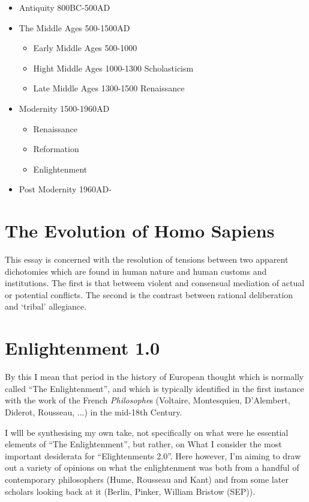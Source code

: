 \documentclass[10pt,titlepage]{article}
\begin{document}
\begin{itemize}
\item Antiquity 800BC-500AD
\item The Middle Ages 500-1500AD
    \begin{itemize}
  \item Early Middle Ages 500-1000
  \item Hight Middle Ages 1000-1300 Scholasticism
  \item Late Middle Ages 1300-1500 Renaissance    
    \end{itemize}
\item Modernity 1500-1960AD
  \begin{itemize}
  \item Renaissance
  \item Reformation
  \item Enlightenment    
    \end{itemize}
\item Post Modernity 1960AD- 
\end{itemize}

\section{The Evolution of Homo Sapiens}

This essay is concerned with the resolution of tensions between two apparent dichotomies which are found in human nature and human customs and institutions.
The first is that betweem violent and consensual mediation of actual or potential conflicts.
The second is the contrast between rational deliberation and `tribal' allegiance.

\section{Enlightenment 1.0}

By this I mean that period in the history of European thought which is normally called ``The Enlightenment'', and which is typically identified in the first instance with the work of the French \emph{Philosophe}s (Voltaire, Montesquieu, D'Alembert, Diderot, Rousseau, ...) in the mid-18th Century.

I wlll be synthesising my own take, not specifically on what were he essential elements of ``The Enlightenment'', but rather, on What I consider the  most important desiderata for ``Elightenments 2.0''.
Here however, I'm aiming to draw out a variety of opinions on what the enlightenment was both from a handful of contemporary philosophers (Hume, Rousseau and Kant) and from some later scholars looking back at it (Berlin, Pinker, William Bristow (SEP)).
\end{document}
